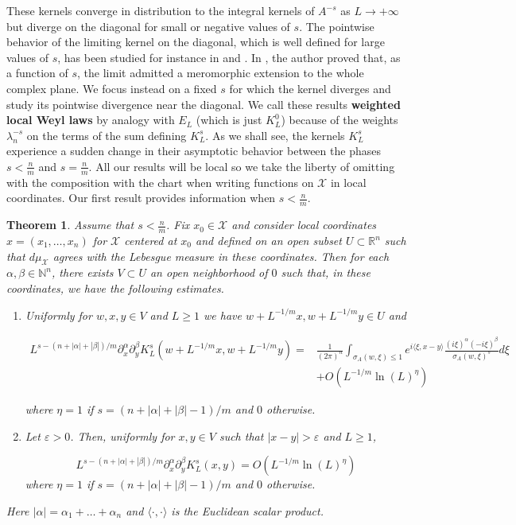 \documentclass[10pt,twoside]{article}
\newcommand{\eps}{\varepsilon}
\newcommand{\R}{\mathbb{R}}
\newcommand{\N}{\mathbb{N}}
\newcommand{\man}{\mathcal{X}}
\newtheorem{theorem}{Theorem}
\numberwithin{theorem}{section}
\begin{document}
These kernels converge in distribution to the integral kernels of $A^{-s}$ as $L\rightarrow +\infty$ but diverge on the diagonal for small or negative values of $s$. The pointwise behavior of the limiting kernel on the diagonal, which is well defined for large values of $s$, has been studied for instance in \cite{see67} and \cite{sch86}. In \cite{sch86}, the author proved that, as a function of $s$, the limit admitted a meromorphic extension to the whole complex plane. We focus instead on a fixed $s$ for which the kernel diverges and study its pointwise divergence near the diagonal. We call these results \textbf{weighted local Weyl laws} by analogy with $E_L$ (which is just $K_L^0$) because of the weights $\lambda_n^{-s}$ on the terms of the sum defining $K^s_L$. As we shall see, the kernels $K_L^s$ experience a sudden change in their asymptotic behavior between the phases $s<\frac{n}{m}$ and $s=\frac{n}{m}$. All our results will be local so we take the liberty of omitting with the composition with the chart when writing functions on $\man$ in local coordinates. Our first result provides information when $s<\frac{n}{m}$.
\begin{theorem}\label{t.diff.1}
Assume that $s<\frac{n}{m}$. Fix $x_0\in\man$ and consider local coordinates $x=(x_1,\dots,x_n)$ for $\man$ centered at $x_0$ and defined on an open subset $U\subset\R^n$ such that $d\mu_\man$ agrees with the Lebesgue measure in these coordinates. Then for each $\alpha,\beta\in\N^n$, there exists $V\subset U$ an open neighborhood of $0$ such that, in these coordinates, we have the following estimates.

\begin{enumerate}
\item Uniformly for $w,x,y\in V$ and $L\geq 1$ we have $w+L^{-1/m}x, w+L^{-1/m}y\in U$ and

\begin{align*}
L^{s-(n+|\alpha|+|\beta|)/m}\partial^\alpha_x\partial^\beta_yK^s_L\left(w+L^{-1/m}x,w+L^{-1/m}y\right)=&\frac{1}{(2\pi)^n}\int_{\sigma_A(w,\xi)\leq 1}e^{i\langle \xi,x-y\rangle}\frac{(i\xi)^\alpha(-i\xi)^\beta}{\sigma_A(w,\xi)^s} d\xi\\
&+O\left(L^{-1/m}\ln\left(L\right)^\eta\right)
\end{align*}

where $\eta = 1$ if $s=(n+|\alpha|+|\beta|-1)/m$ and $0$ otherwise.

\item Let $\eps>0$. Then, uniformly for $x,y\in V$ such that $|x-y|>\eps$ and $L\geq 1$,

\[
L^{s-(n+|\alpha|+|\beta|)/m}\partial^\alpha_x\partial^\beta_y K^s_L(x,y)=O\left(L^{-1/m}\ln\left(L\right)^\eta\right)
\]
where $\eta = 1$ if $s=(n+|\alpha|+|\beta|-1)/m$ and $0$ otherwise.
\end{enumerate}
Here $|\alpha|=\alpha_1+\dots+\alpha_n$ and $\langle\cdot,\cdot\rangle$ is the Euclidean scalar product.
\end{theorem}
\end{document}
